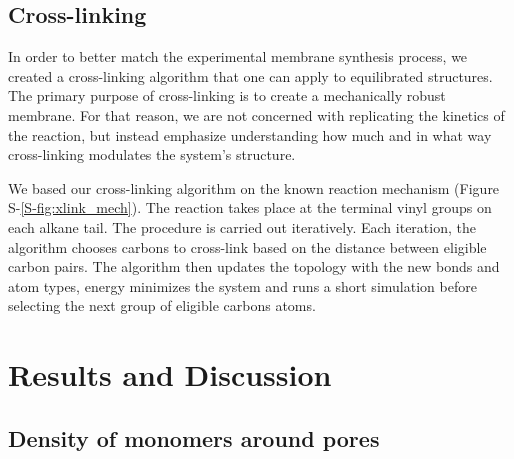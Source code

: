 \documentclass[journal=jpcbfk,manuscript=article]{achemso}
\begin{document}
  \subsection{Cross-linking}
  
  In order to better match the experimental membrane synthesis process,
  we created a cross-linking algorithm that one can apply to equilibrated structures. 
  The primary purpose of cross-linking is to create a mechanically robust membrane.
  For that reason, we are not concerned with replicating the kinetics of the reaction, 
  but instead emphasize understanding how much and in what way cross-linking modulates
  the system's structure.

  We based our cross-linking algorithm on the known reaction mechanism 
  (Figure S-\ref{S-fig:xlink_mech}). The reaction takes place at the terminal vinyl groups
  on each alkane tail. The procedure is carried out iteratively. Each iteration, the
  algorithm chooses carbons to cross-link based on the distance between eligible 
  carbon pairs. The algorithm then updates the topology with the new bonds and atom
  types, energy minimizes the system and runs a short simulation before selecting 
  the next group of eligible carbons atoms.

  \section{Results and Discussion}
  
  \subsection{Density of monomers around pores}\label{section:mon_per_pore}
\end{document}
